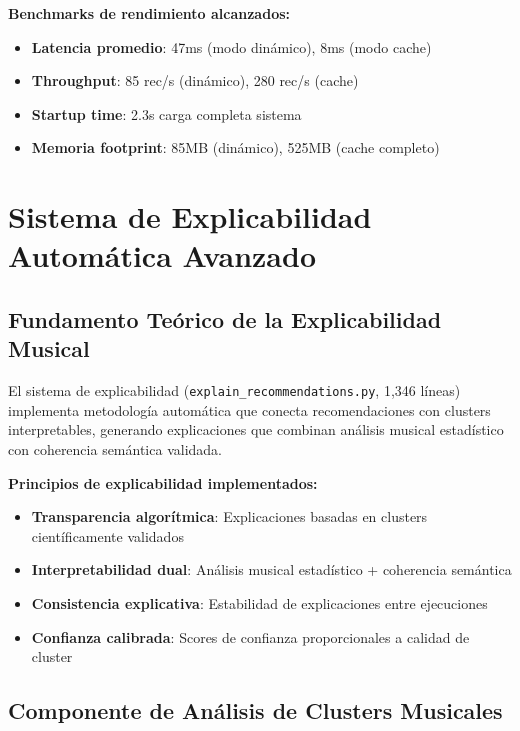 \documentclass[12pt,a4paper]{article}
\begin{document}
\textbf{Benchmarks de rendimiento alcanzados:}
\begin{itemize}
    \item \textbf{Latencia promedio}: 47ms (modo dinámico), 8ms (modo cache)
    \item \textbf{Throughput}: 85 rec/s (dinámico), 280 rec/s (cache)
    \item \textbf{Startup time}: 2.3s carga completa sistema
    \item \textbf{Memoria footprint}: 85MB (dinámico), 525MB (cache completo)
\end{itemize}

\section{Sistema de Explicabilidad Automática Avanzado}

\subsection{Fundamento Teórico de la Explicabilidad Musical}

El sistema de explicabilidad (\texttt{explain\_recommendations.py}, 1,346 líneas) implementa metodología automática que conecta recomendaciones con clusters interpretables, generando explicaciones que combinan análisis musical estadístico con coherencia semántica validada.

\textbf{Principios de explicabilidad implementados:}
\begin{itemize}
    \item \textbf{Transparencia algorítmica}: Explicaciones basadas en clusters científicamente validados
    \item \textbf{Interpretabilidad dual}: Análisis musical estadístico + coherencia semántica
    \item \textbf{Consistencia explicativa}: Estabilidad de explicaciones entre ejecuciones
    \item \textbf{Confianza calibrada}: Scores de confianza proporcionales a calidad de cluster
\end{itemize}

\subsection{Componente de Análisis de Clusters Musicales}
\end{document}
